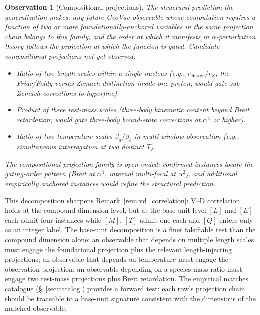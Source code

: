 \documentclass[11pt]{article}
\newtheorem{observation}{Observation}
\begin{document}
\begin{observation}[Compositional projections]
The structural prediction the generalization makes: any future
GeoVac observable whose computation requires a function of two or
more foundationally-anchored variables in the same projection chain
belongs to this family, and the order at which it manifests in
$\alpha$-perturbation theory follows the projection at which the
function is gated.  Candidate compositional projections not yet
observed:

\begin{itemize}\setlength\itemsep{0pt}
\item Ratio of two length scales within a single nucleus (e.g.,
$r_\text{charge} / r_Z$, the Friar/Foldy-versus-Zemach distinction
inside one proton; would gate sub-Zemach corrections to hyperfine).
\item Product of three rest-mass scales (three-body kinematic
content beyond Breit retardation; would gate three-body bound-state
corrections at $\alpha^4$ or higher).
\item Ratio of two temperature scales $\beta_a / \beta_b$ in
multi-window observation (e.g., simultaneous interrogation at two
distinct $T$).
\end{itemize}

The compositional-projection family is open-ended: confirmed
instances locate the gating-order pattern (Breit at $\alpha^4$,
internal multi-focal at $\alpha^2$), and additional empirically
anchored instances would refine the structural prediction.
\end{observation}

This decomposition sharpens
Remark~\ref{rem:vd_correlation}: V--D correlation holds at the
compound dimension level, but at the base-unit level $[L]$ and
$[E]$ each admit four instances while $[M]$, $[T]$ admit one each
and $[Q]$ enters only as an integer label.  The base-unit
decomposition is a finer falsifiable test than the compound
dimension alone: an observable that depends on multiple length
scales must engage the foundational projection plus the relevant
length-injecting projections; an observable that depends on
temperature must engage the observation projection; an observable
depending on a species mass ratio must engage two rest-mass
projections plus Breit retardation.  The empirical matches
catalogue (\S~\ref{sec:catalog}) provides a forward test:
each row's projection chain should be traceable to a base-unit
signature consistent with the dimensions of the matched
observable.

\end{document}
